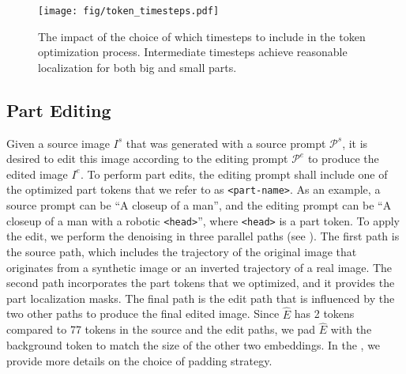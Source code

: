 \begin{figure*}
    \centering
    \texttt{[image: fig/token\_timesteps.pdf]}
    \caption{The impact of the choice of which timesteps to include in the token optimization process. Intermediate timesteps achieve reasonable localization for both big and small parts.}
    \label{fig:ts}
\end{figure*}

\subsection{Part Editing} \label{sec:edit} 
Given a source image $I^s$ that was generated with a source prompt $\mathcal{P}^s$, it is desired to edit this image according to the editing prompt $\mathcal{P}^e$ to produce the edited image $I^e$.
To perform part edits, the editing prompt shall include one of the optimized part tokens that we refer to as \texttt{<part-name>}.
As an example, a source prompt can be ``A closeup of a man'', and the editing prompt can be ``A closeup of a man with a robotic \texttt{<head>}'', where \texttt{<head>} is a part token.
To apply the edit, we perform the denoising in three parallel paths (see ).
The first path is the source path, which includes the trajectory of the original image that originates from a synthetic image or an inverted trajectory of a real image.
The second path incorporates the part tokens that we optimized, and it provides the part localization masks. 
The final path is the edit path that is influenced by the two other paths to produce the final edited image.
Since $\hat{E}$ has 2 tokens compared to 77 tokens in the source and the edit paths, we pad $\hat{E}$ with the background token to match the size of the other two embeddings.
In the , we provide more details on the choice of padding strategy.

